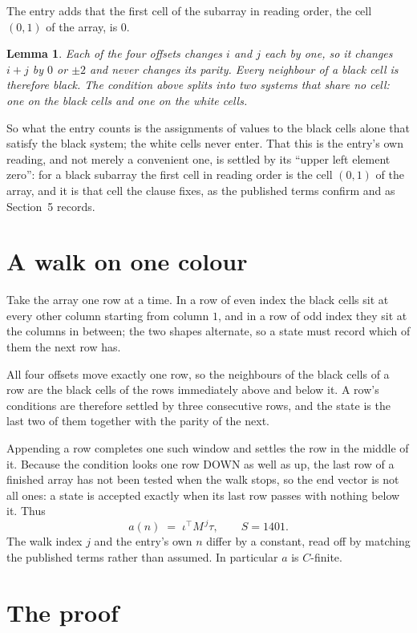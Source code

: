 \documentclass[11pt,a4paper]{article}
\theoremstyle{plain}
\newtheorem{lemma}[theorem]{Lemma}
\theoremstyle{definition}
\begin{document}
The entry adds that the first cell of the subarray in reading order, the cell $(0,1)$ of the array, is $0$.

\begin{lemma}\label{lem:split}
Each of the four offsets changes $i$ and $j$ each by one, so it changes $i+j$ by $0$ or $\pm2$
and never changes its parity. Every neighbour of a black cell is therefore black. The condition
above splits into two systems that share no cell: one on the black cells and one on the white
cells.
\end{lemma}

So what the entry counts is the assignments of values to the black cells alone that satisfy the
black system; the white cells never enter. That this is the entry's own reading, and not
merely a convenient one, is settled by its ``upper left element zero'': for a black subarray the
first cell in reading order is the cell $(0,1)$ of the array, and it is that cell the
clause fixes, as the published terms confirm and as Section~5 records.

\section{A walk on one colour}

Take the array one row at a time. In a row of even index the black cells sit at every other
column starting from column $1$, and in a row of odd index they sit at the columns in
between; the two shapes alternate, so a state must record which of them the next row has.

All four offsets move exactly one row, so the neighbours of the black cells of a row are the
black cells of the rows immediately above and below it. A row's conditions are therefore settled
by three consecutive rows, and the state is the last two of them together with the parity of the
next.

Appending a row completes one such window and settles the row in the middle of it. Because the
condition looks one row DOWN as well as up, the last row of a finished array has not been tested
when the walk stops, so the end vector is not all ones: a state is accepted exactly when its
last row passes with nothing below it. Thus
\[
a(n)\;=\;\iota^{\!\top}M^{\,j}\tau ,\qquad S=1401.
\]
The walk index $j$ and the entry's own $n$ differ by a constant, read off by matching the
published terms rather than assumed. In particular $a$ is $C$-finite.

\section{The proof}
\end{document}
